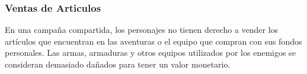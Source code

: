 \documentclass[a4paper,twocolumn,openany,10pt]{dndbook}
\begin{document}
\subsubsection*{Ventas de Articulos}
En una campaña compartida, los personajes no tienen derecho a vender los artículos que encuentran en las aventuras o el equipo
que compran con sus fondos personales. Las armas, armaduras y otros equipos utilizados por los enemigos se consideran demasiado
dañados para tener un valor monetario. 
\end{document}
